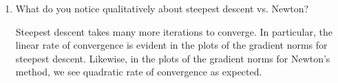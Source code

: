 \documentclass[11pt]{amsart}
\begin{document}
\begin{enumerate}
\begin{enumerate}
\item What do you notice qualitatively about steepest descent vs. Newton?

  Steepest descent takes many more iterations to converge. In particular, the
  linear rate of convergence is evident in the plots of the gradient norms for
  steepest descent. Likewise, in the plots of the gradient norms for Newton's
  method, we see quadratic rate of convergence as expected. 
\end{enumerate}

\bigskip\bigskip




\end{enumerate}
\end{document}

